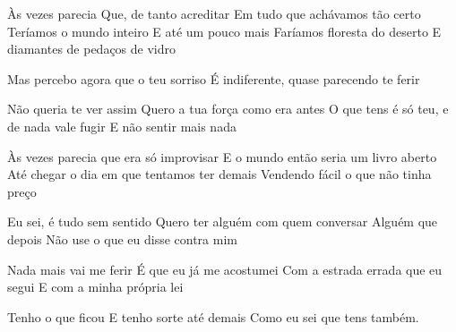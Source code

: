 \begin{poem}
\begin{stanza}
Às vezes parecia\verseline
Que, de tanto acreditar\verseline
Em tudo que achávamos tão certo\verseline
Teríamos o mundo inteiro\verseline
E até um pouco mais\verseline
Faríamos floresta do deserto\verseline
E diamantes de pedaços de vidro
\end{stanza}
\begin{stanza}
Mas percebo agora que o teu sorriso\verseline
É indiferente, quase parecendo te ferir
\end{stanza}
\begin{stanza}
Não queria te ver assim\verseline
Quero a tua força como era antes\verseline
O que tens é só teu, e de nada vale fugir\verseline
E não sentir mais nada
\end{stanza}
\begin{stanza}
Às vezes parecia que era só improvisar\verseline
E o mundo então seria um livro aberto\verseline
Até chegar o dia em que tentamos ter demais\verseline
Vendendo fácil o que não tinha preço
\end{stanza}
\begin{stanza}
Eu sei, é tudo sem sentido\verseline
Quero ter alguém com quem conversar\verseline
Alguém que depois\verseline
Não use o que eu disse contra mim
\end{stanza}
\begin{stanza}
Nada mais vai me ferir\verseline
É que eu já me acostumei\verseline
Com a estrada errada que eu segui\verseline
E com a minha própria lei
\end{stanza}
\begin{stanza}
Tenho o que ficou\verseline
E tenho sorte até demais\verseline
Como eu sei que tens também.
\end{stanza}
\end{poem}